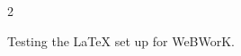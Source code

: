 \documentclass[10pt]{article}
\begin{document}
\voffset=-0.8in
\begin{multicols}{2}


Testing the LaTeX set up for WeBWorK.


\end{multicols}
\vfill
\end{document}
